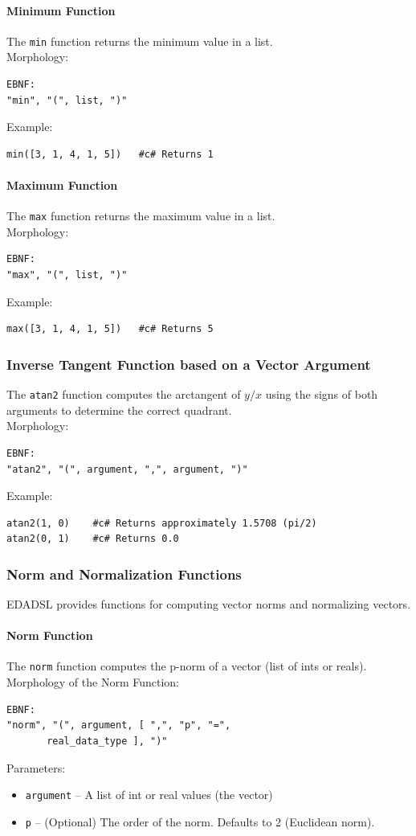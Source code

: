 \documentclass{report}
\begin{document}
\paragraph{Minimum Function}
The \texttt{min} function returns the minimum value in a list. \\
Morphology:
\begin{verbatim}
EBNF:
"min", "(", list, ")"
\end{verbatim}
Example:
\begin{verbatim}
min([3, 1, 4, 1, 5])   #c# Returns 1
\end{verbatim}

\paragraph{Maximum Function}
The \texttt{max} function returns the maximum value in a list. \\
Morphology:
\begin{verbatim}
EBNF:
"max", "(", list, ")"
\end{verbatim}
Example:
\begin{verbatim}
max([3, 1, 4, 1, 5])   #c# Returns 5
\end{verbatim}

\subsubsection{Inverse Tangent Function based on a Vector Argument}
The \texttt{atan2} function computes the arctangent of $y/x$ using the signs of both arguments to determine the correct quadrant. \\
Morphology:
\begin{verbatim}
EBNF:
"atan2", "(", argument, ",", argument, ")"
\end{verbatim}
Example:
\begin{verbatim}
atan2(1, 0)    #c# Returns approximately 1.5708 (pi/2)
atan2(0, 1)    #c# Returns 0.0
\end{verbatim}

\subsubsection{Norm and Normalization Functions}
EDADSL provides functions for computing vector norms and normalizing vectors.

\paragraph{Norm Function}
The \texttt{norm} function computes the p-norm of a vector (list of ints or reals). \\
Morphology of the Norm Function:
\begin{verbatim}
EBNF:
"norm", "(", argument, [ ",", "p", "=", 
       real_data_type ], ")"
\end{verbatim}
Parameters:
\begin{itemize}
\item \texttt{argument} -- A list of int or real values (the vector)
\item \texttt{p} -- (Optional) The order of the norm. Defaults to 2 (Euclidean norm).
\end{itemize}
\end{document}
